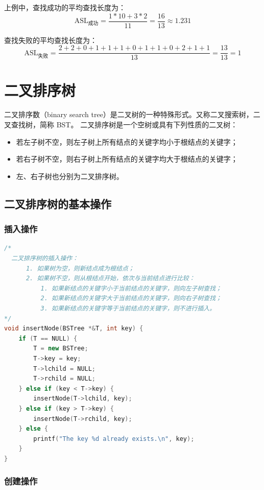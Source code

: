 \documentclass[lang=cn,newtx,10pt,scheme=chinese]{../elegantbook}
\begin{document}
上例中，查找成功的平均查找长度为：
\[
\text{ASL}_{\text{成功}} = \frac{1*10+3*2}{11} = \frac{16}{13} \approx 1.231
\]

查找失败的平均查找长度为：
\[
\text{ASL}_{\text{失败}} = \frac{2+2+0+1+1+1+0+1+1+0+2+1+1}{13} = \frac{13}{13} = 1
\]
\section{二叉排序树}

二叉排序数（binary search tree）是二叉树的一种特殊形式。又称二叉搜索树，二叉查找树，简称 BST。
二叉排序树是一个空树或具有下列性质的二叉树：

\begin{itemize}
  \item 若左子树不空，则左子树上所有结点的关键字均小于根结点的关键字；
  \item 若右子树不空，则右子树上所有结点的关键字均大于根结点的关键字；
  \item 左、右子树也分别为二叉排序树。
  \end{itemize}


  \subsection{二叉排序树的基本操作}

\subsubsection{插入操作}

\begin{lstlisting}[language=C++, caption={二叉排序树的插入操作}]
  /*
  二叉排序树的插入操作：
      1. 如果树为空，则新结点成为根结点；
      2. 如果树不空，则从根结点开始，依次与当前结点进行比较：
          1. 如果新结点的关键字小于当前结点的关键字，则向左子树查找；
          2. 如果新结点的关键字大于当前结点的关键字，则向右子树查找；
          3. 如果新结点的关键字等于当前结点的关键字，则不进行插入。
*/
void insertNode(BSTree *&T, int key) {
    if (T == NULL) {
        T = new BSTree;
        T->key = key;
        T->lchild = NULL;
        T->rchild = NULL;
    } else if (key < T->key) {
        insertNode(T->lchild, key);
    } else if (key > T->key) {
        insertNode(T->rchild, key);
    } else {
        printf("The key %d already exists.\n", key);
    }
}
\end{lstlisting}



\subsubsection{创建操作}
\end{document}
